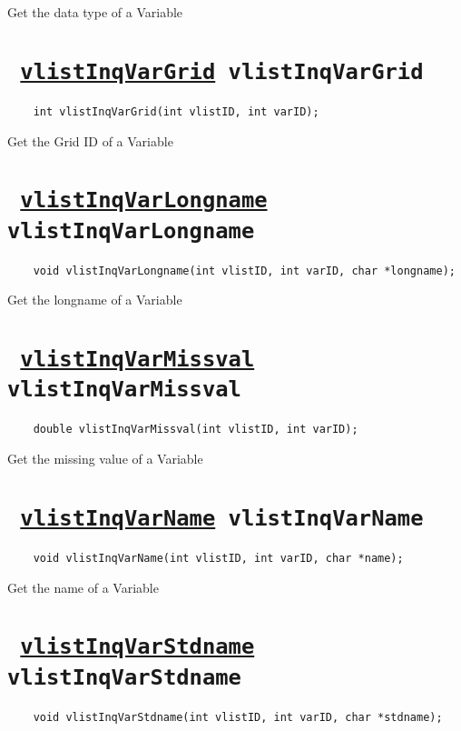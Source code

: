 Get the data type of a Variable
\ifpdfoutput{}{(\ref{vlistInqVarDatatype})}


\section*{\tt 
\ifpdf
\hyperref[vlistInqVarGrid]{vlistInqVarGrid}
\else
vlistInqVarGrid
\fi
}
\begin{verbatim}
    int vlistInqVarGrid(int vlistID, int varID);
\end{verbatim}

Get the Grid ID of a Variable
\ifpdfoutput{}{(\ref{vlistInqVarGrid})}


\section*{\tt 
\ifpdf
\hyperref[vlistInqVarLongname]{vlistInqVarLongname}
\else
vlistInqVarLongname
\fi
}
\begin{verbatim}
    void vlistInqVarLongname(int vlistID, int varID, char *longname);
\end{verbatim}

Get the longname of a Variable
\ifpdfoutput{}{(\ref{vlistInqVarLongname})}


\section*{\tt 
\ifpdf
\hyperref[vlistInqVarMissval]{vlistInqVarMissval}
\else
vlistInqVarMissval
\fi
}
\begin{verbatim}
    double vlistInqVarMissval(int vlistID, int varID);
\end{verbatim}

Get the missing value of a Variable
\ifpdfoutput{}{(\ref{vlistInqVarMissval})}


\section*{\tt 
\ifpdf
\hyperref[vlistInqVarName]{vlistInqVarName}
\else
vlistInqVarName
\fi
}
\begin{verbatim}
    void vlistInqVarName(int vlistID, int varID, char *name);
\end{verbatim}

Get the name of a Variable
\ifpdfoutput{}{(\ref{vlistInqVarName})}


\section*{\tt 
\ifpdf
\hyperref[vlistInqVarStdname]{vlistInqVarStdname}
\else
vlistInqVarStdname
\fi
}
\begin{verbatim}
    void vlistInqVarStdname(int vlistID, int varID, char *stdname);
\end{verbatim}

